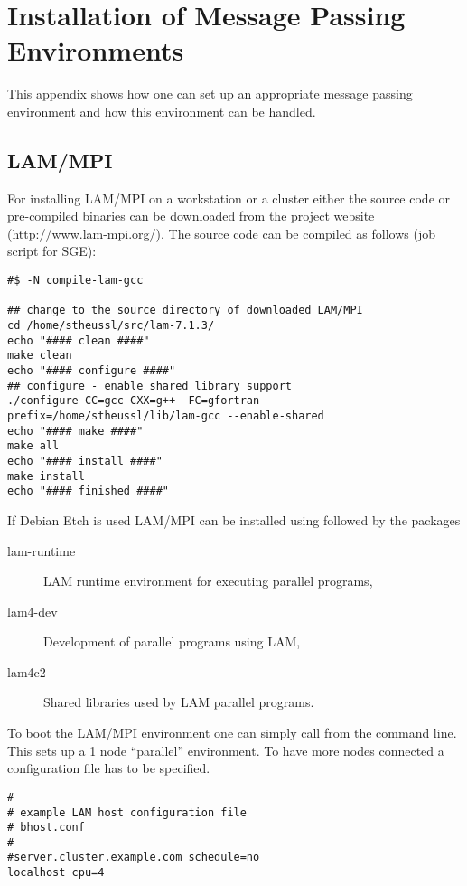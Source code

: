 
\chapter{Installation of Message Passing Environments}
\label{app:mpi_imp}

This appendix shows how one can set up an appropriate message
passing environment and how this environment can be handled.

\section{LAM/MPI}

For installing LAM/MPI on a workstation or a cluster
either the source code or pre-compiled binaries can be downloaded from
the project website (\url{http://www.lam-mpi.org/}).
The source code can be compiled as follows (job script for SGE):

\begin{verbatim}
#$ -N compile-lam-gcc

## change to the source directory of downloaded LAM/MPI
cd /home/stheussl/src/lam-7.1.3/
echo "#### clean ####"
make clean
echo "#### configure ####"
## configure - enable shared library support
./configure CC=gcc CXX=g++  FC=gfortran --prefix=/home/stheussl/lib/lam-gcc --enable-shared
echo "#### make ####"
make all
echo "#### install ####"
make install
echo "#### finished ####"
\end{verbatim}

If Debian Etch is used LAM/MPI can be installed using  followed by the packages

\begin{description}
\item[lam-runtime] LAM runtime environment for executing parallel programs,
\item[lam4-dev] Development of parallel programs using LAM,
\item[lam4c2] Shared libraries used by LAM parallel programs.
\end{description}

To boot the LAM/MPI environment one can simply call 
from the command line. This sets up a 1 node ``parallel''
environment. To have more nodes connected a configuration file has to
be specified.

\begin{verbatim}
#
# example LAM host configuration file
# bhost.conf
#
#server.cluster.example.com schedule=no
localhost cpu=4
\end{verbatim}

